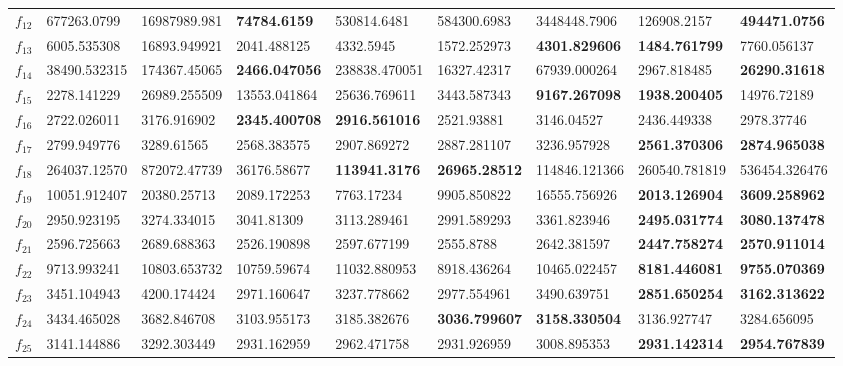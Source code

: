 \begin{table*}[h!]
\begin{tabular}{|p{0.8cm}|p{1.6cm}|p{1.6cm}|p{1.6cm}|p{1.6cm}|p{1.6cm}|p{1.6cm}|p{1.6cm}|p{1.6cm}|}
$f_{12}$  & 677263.0799 & 16987989.981 & \textbf{74784.6159} & 530814.6481 & 584300.6983 & 3448448.7906 & 126908.2157 & \textbf{494471.0756} \\ 
$f_{13}$  & 6005.535308 & 16893.949921 & 2041.488125 & 4332.5945 & 1572.252973 & \textbf{4301.829606} & \textbf{1484.761799} & 7760.056137 \\ 
$f_{14}$  & 38490.532315 & 174367.45065 & \textbf{2466.047056} & 238838.470051 & 16327.42317 & 67939.000264 & 2967.818485 & \textbf{26290.31618} \\ 
$f_{15}$  & 2278.141229 & 26989.255509 & 13553.041864 & 25636.769611 & 3443.587343 & \textbf{9167.267098} & \textbf{1938.200405} & 14976.72189 \\ 
$f_{16}$  & 2722.026011 & 3176.916902 & \textbf{2345.400708} & \textbf{2916.561016} & 2521.93881 & 3146.04527 & 2436.449338 & 2978.37746 \\ 
$f_{17}$  & 2799.949776 & 3289.61565 & 2568.383575 & 2907.869272 & 2887.281107 & 3236.957928 & \textbf{2561.370306} & \textbf{2874.965038} \\ 
$f_{18}$  & 264037.12570 & 872072.47739 & 36176.58677 & \textbf{113941.3176} & \textbf{26965.28512} & 114846.121366 & 260540.781819 & 536454.326476 \\ 
$f_{19}$  & 10051.912407 & 20380.25713 & 2089.172253 & 7763.17234 & 9905.850822 & 16555.756926 & \textbf{2013.126904} & \textbf{3609.258962} \\ 
$f_{20}$  & 2950.923195 & 3274.334015 & 3041.81309 & 3113.289461 & 2991.589293 & 3361.823946 & \textbf{2495.031774} & \textbf{3080.137478} \\ 
$f_{21}$  & 2596.725663 & 2689.688363 & 2526.190898 & 2597.677199 & 2555.8788 & 2642.381597 & \textbf{2447.758274} & \textbf{2570.911014} \\ 
$f_{22}$  & 9713.993241 & 10803.653732 & 10759.59674 & 11032.880953 & 8918.436264 & 10465.022457 & \textbf{8181.446081} & \textbf{9755.070369} \\ 
$f_{23}$ & 3451.104943 & 4200.174424 & 2971.160647 & 3237.778662 & 2977.554961 & 3490.639751 & \textbf{2851.650254} & \textbf{3162.313622} \\ 
$f_{24}$  & 3434.465028 & 3682.846708 & 3103.955173 & 3185.382676 & \textbf{3036.799607} & \textbf{3158.330504} & 3136.927747 & 3284.656095 \\ 
$f_{25}$  & 3141.144886 & 3292.303449 & 2931.162959 & 2962.471758 & 2931.926959 & 3008.895353 & \textbf{2931.142314} & \textbf{2954.767839} \\ 

\end{tabular}
\end{table*}

